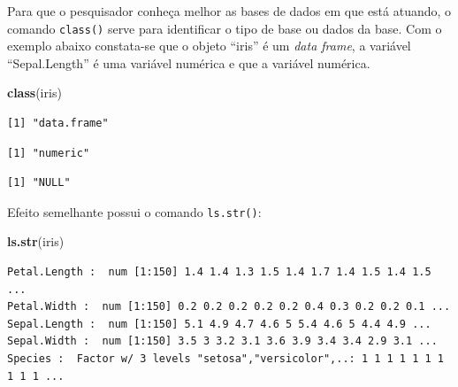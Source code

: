 \documentclass[12pt,brazil,oneside]{book}
\newenvironment{Shaded}{\begin{snugshade}}{\end{snugshade}}
\newcommand{\KeywordTok}[1]{\textcolor[rgb]{0.13,0.29,0.53}{\textbf{#1}}}
\newcommand{\NormalTok}[1]{#1}
\newcommand{\OperatorTok}[1]{\textcolor[rgb]{0.81,0.36,0.00}{\textbf{#1}}}
\begin{document}
Para que o pesquisador conheça melhor as bases de dados em que está atuando, o comando \texttt{class()} serve para identificar o tipo de base ou dados da base. Com o exemplo abaixo constata-se que o objeto ``iris'' é um \emph{data frame}, a variável ``Sepal.Length'' é uma variável numérica e que a variável numérica.

\begin{Shaded}
\begin{Highlighting}[]
\KeywordTok{class}\NormalTok{(iris)}
\end{Highlighting}
\end{Shaded}

\begin{verbatim}
[1] "data.frame"
\end{verbatim}

\begin{Shaded}
\end{Shaded}

\begin{verbatim}
[1] "numeric"
\end{verbatim}

\begin{Shaded}
\end{Shaded}

\begin{verbatim}
[1] "NULL"
\end{verbatim}

Efeito semelhante possui o comando \texttt{ls.str()}:

\begin{Shaded}
\begin{Highlighting}[]
\KeywordTok{ls.str}\NormalTok{(iris)}
\end{Highlighting}
\end{Shaded}

\begin{verbatim}
Petal.Length :  num [1:150] 1.4 1.4 1.3 1.5 1.4 1.7 1.4 1.5 1.4 1.5 ...
Petal.Width :  num [1:150] 0.2 0.2 0.2 0.2 0.2 0.4 0.3 0.2 0.2 0.1 ...
Sepal.Length :  num [1:150] 5.1 4.9 4.7 4.6 5 5.4 4.6 5 4.4 4.9 ...
Sepal.Width :  num [1:150] 3.5 3 3.2 3.1 3.6 3.9 3.4 3.4 2.9 3.1 ...
Species :  Factor w/ 3 levels "setosa","versicolor",..: 1 1 1 1 1 1 1 1 1 1 ...
\end{verbatim}
\end{document}
